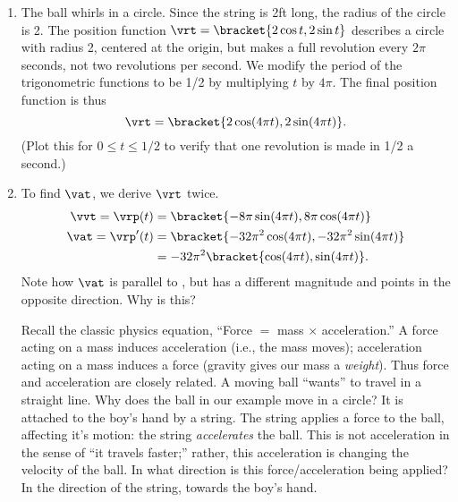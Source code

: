 {\begin{enumerate}
	\item The ball whirls in a  circle. Since the string is 2ft long, the radius of the circle is 2. The position function $\vrt =\bracket{2\cos t, 2\sin t}$ describes a circle with radius 2, centered at the origin, but makes a full revolution every $2\pi$ seconds, not two revolutions per second. We modify the period of the trigonometric functions to be 1/2 by multiplying $t$ by $4\pi$. The final position function is thus \[\vrt =\bracket{2\cos (4\pi t), 2\sin (4\pi t)}.\]
	(Plot this for $0\leq t\leq 1/2$ to verify that one revolution is made in 1/2 a second.)
	
	\item		To find $\vat$, we derive $\vrt$ twice.
	\begin{align*}
	\vvt = \vrp(t) &=\bracket{-8\pi \sin (4\pi t), 8\pi \cos (4\pi t)}\\
	\vat =\vrp'(t) &=\bracket{-32\pi^2 \cos (4\pi t), -32\pi^2 \sin (4\pi t)}\\
				&= -32\pi^2\bracket{\cos (4\pi t), \sin (4\pi t)}.
	\end{align*}
	Note how $\vat$ is parallel to \vrt, but has a different magnitude and points in the opposite direction. Why is this?
	
	Recall the classic physics equation, ``Force $=$ mass $\times$ acceleration.'' A force acting on a mass induces acceleration (i.e., the mass moves); acceleration acting on a mass induces a force (gravity gives our mass a \emph{weight}). Thus force and acceleration are closely related. A moving ball ``wants'' to travel in a straight line. Why does the ball in our example move in a circle? It is attached to the boy's hand by a string. The string applies a force to the ball, affecting it's motion: the string \emph{accelerates} the ball. This is not acceleration in the sense of ``it travels faster;'' rather, this acceleration is changing the velocity of the ball. In what direction is this force/acceleration being applied? In the direction of the string, towards the boy's hand.
	

\end{enumerate}}
